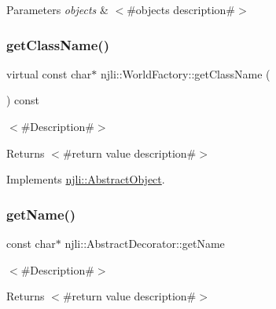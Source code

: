 \begin{DoxyParams}{Parameters}
{\em objects} & $<$\#objects description\#$>$ \\
\hline
\end{DoxyParams}
\mbox{\label{classnjli_1_1_world_factory_a4b6bea9cdcaa93916dc53f8d710be9a2}} 
\subsubsection{\texorpdfstring{get\+Class\+Name()}{getClassName()}}
{\footnotesize\ttfamily virtual const char$\ast$ njli\+::\+World\+Factory\+::get\+Class\+Name (\begin{DoxyParamCaption}{ }\end{DoxyParamCaption}) const\hspace{0.3cm}{\ttfamily [virtual]}}

$<$\#\+Description\#$>$

\begin{DoxyReturn}{Returns}
$<$\#return value description\#$>$ 
\end{DoxyReturn}


Implements \mbox{\hyperlink{classnjli_1_1_abstract_object_afdabb48c4bf763e297ffe810b433a863}{njli\+::\+Abstract\+Object}}.

\mbox{\label{classnjli_1_1_world_factory_ad41266885be835f3ee602311e20877a4}} 
\subsubsection{\texorpdfstring{get\+Name()}{getName()}}
{\footnotesize\ttfamily const char$\ast$ njli\+::\+Abstract\+Decorator\+::get\+Name}

$<$\#\+Description\#$>$

\begin{DoxyReturn}{Returns}
$<$\#return value description\#$>$ 
\end{DoxyReturn}
\mbox{\label{classnjli_1_1_world_factory_ad3bdc94fc0ef8cafada8f7d0796a77f0}} 
